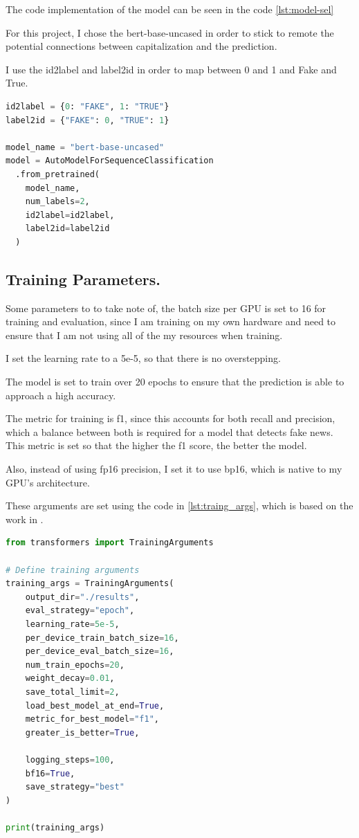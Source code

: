 \documentclass[conference]{IEEEtran}
\begin{document}
The code implementation of the model can be seen in the code \ref{lst:model-sel}

For this project, I chose the bert-base-uncased in order to stick to remote the potential connections between capitalization and the prediction. 

I use the id2label and label2id in order to map between 0 and 1 and Fake and True.

\begin{lstlisting}[language=Python,caption={Model Selection},label={lst:model-sel}]
id2label = {0: "FAKE", 1: "TRUE"}
label2id = {"FAKE": 0, "TRUE": 1}

model_name = "bert-base-uncased"
model = AutoModelForSequenceClassification
  .from_pretrained(
    model_name,
    num_labels=2,
    id2label=id2label,
    label2id=label2id
  )
\end{lstlisting}

\subsection{Training Parameters.}

Some parameters to to take note of, the batch size per GPU is set to 16 for training and evaluation, since I am training on my own hardware and need to ensure that I am not using all of the my resources when training. 

I set the learning rate to a 5e-5, so that there is no overstepping.

The model is set to train over 20 epochs to ensure that the prediction is able to approach a high accuracy. 

The metric for training is f1, since this accounts for both recall and precision, which a balance between both is required for a model that detects fake news. This metric is set so that the higher the f1 score, the better the model.

Also, instead of using fp16 precision, I set it to use bp16, which is native to my GPU's architecture.

These arguments are set using the code in \ref{lst:traing_args}, which is based on the work in \cite{medium_bert_guide}.

\begin{lstlisting}[language=Python,caption={Training Arguments},label={lst:traing_args}]
from transformers import TrainingArguments

# Define training arguments
training_args = TrainingArguments(
    output_dir="./results",           
    eval_strategy="epoch",     
    learning_rate=5e-5,              
    per_device_train_batch_size=16,  
    per_device_eval_batch_size=16,
    num_train_epochs=20,              
    weight_decay=0.01,               
    save_total_limit=2,              
    load_best_model_at_end=True,     
    metric_for_best_model="f1",      
    greater_is_better=True,          
    
    logging_steps=100,               
    bf16=True,                        
    save_strategy="best"
)

print(training_args)
\end{lstlisting}
\end{document}
